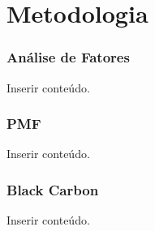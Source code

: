 \section{Metodologia}

\begin{frame}
  \frametitle{Análise de Fatores}
  Inserir conteúdo.
\end{frame}

\begin{frame}
  \frametitle{PMF}
  Inserir conteúdo.
\end{frame}

\begin{frame}
  \frametitle{Black Carbon}
  Inserir conteúdo.
\end{frame}
